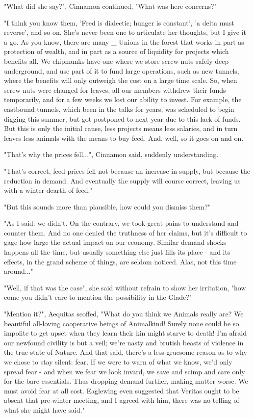 
"What did she say?", Cinnamon continued, "What was here concerns?"

"I think you know them, 'Feed is dialectic; hunger is constant', 'a delta must reverse', and so on. She's never been one to articulate her thoughts, but I give it a go. As you know, there are many \_ Unions in the forest that works in part as protection of wealth, and in part as a source of liquidity for projects which benefits all. We chipmunks have one where we store screw-nuts safely deep underground, and use part of it to fund large operations, such as new tunnels, where the benefits will only outweigh the cost on a large time scale. So, when screw-nuts were changed for leaves, all our members withdrew their funds temporarily, and for a few weeks we lost our ability to invest. For example, the eastbound tunnels, which been in the talks for years, was scheduled to begin digging this summer, but got postponed to next year due to this lack of funds.
   But this is only the initial cause, less projects means less salaries, and in turn leaves less animals with the means to buy feed. And, well, so it goes on and on.

"That's why the prices fell...", Cinnamon said, suddenly understanding.

"That's correct, feed prices fell not because an increase in supply, but because the reduction in demand. And eventually the supply will course correct, leaving us with a winter dearth of feed."


"But this sounds more than plausible, how could you dismiss them?"

"As I said: we didn't. On the contrary, we took great pains to understand and counter them. And no one denied the truthness of her claims, but it's difficult to gage how large the actual impact on our economy. Similar demand shocks happens all the time, but usually something else just fills its place - and its effects, in the grand scheme of things, are seldom noticed. Alas, not this time around..."

"Well, if that was the case", she said without refrain to show her irritation, "how come you didn't care to mention the possibility in the Glade?"

"Mention it?", Aequitas scoffed, "What do you think we Animals really are? We beautiful all-loving cooperative beings of Animalkind! Surely none could be so impolite to get upset when they learn their kin might starve to death! I'm afraid our newfound civility is but a veil; we're nasty and brutish beasts of violence in the true state of Nature.
  And that said, there's a less gruesome reason as to why we chose to stay silent: fear. If we were to warn of what we know, we'd only 
spread fear - and when we fear we look invard, we save and scimp and care only for the bare essentials. Thus dropping demand further, making matter worse. We must avoid fear at all cost. Eaglewing even suggested that Veritas ought to be absent that pre-winter meeting, and I agreed with him, there was no telling of what she might have said."

